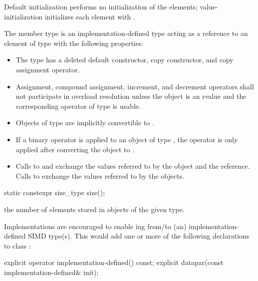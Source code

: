 \pnum Default initialization performs no initialization of the elements; value-initialization initializes each element with .

\pnum The member type  is an implementation-defined type acting as a reference to an element of type  with the following properties:
\label{sec:reference type}
\begin{itemize}
  \item The type has a deleted default constructor, copy constructor, and copy assignment operator.

  \item Assignment, compound assignment, increment, and decrement operators shall not participate in overload resolution unless the  object is an rvalue and the corresponding operator of type  is usable.

  \item Objects of type  are implicitly convertible to .

  \item If a binary operator is applied to an object of type , the operator is only applied after converting the  object to .

  \item Calls to  and  exchange the values referred to by the  object and the  reference.
  Calls to  exchange the values referred to by the  objects.
\end{itemize}

\begin{itemdecl}
static constexpr size_type size();
\end{itemdecl}
\begin{itemdescr}
  \pnum\returns the number of elements stored in objects of the given \datapar[<T, Abi>] type.
\end{itemdescr}

\pnum\begin{noteEnv} Implementations are encouraged to enable ing from/to (an) implementation-defined SIMD type(s).
This would add one or more of the following declarations to class \datapar:
\begin{itemdecl}
explicit operator implementation-defined() const;
explicit datapar(const implementation-defined& init);
\end{itemdecl}
\end{noteEnv}

